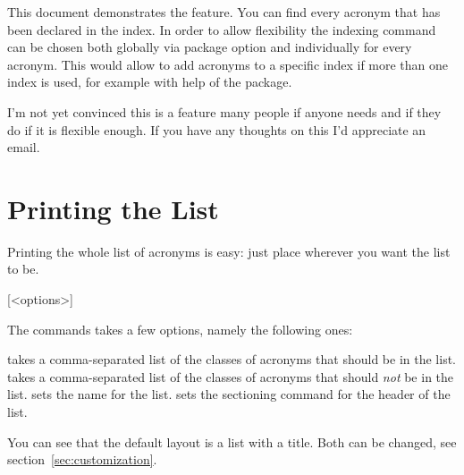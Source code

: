 \documentclass[DIV10,toc=index,toc=bib,hyperfootnotes=false]{cnpkgdoc}
\makeatletter
\newcommand*\changedversion[1]{%
  \@bsphack
  \marginnote{%
    \footnotesize\sffamily\RaggedRight
    \textcolor{black!75}{Changed in version~#1}}%
  \@esphack}
\makeatother
\begin{document}
This document demonstrates the feature. You can find every acronym that has been
declared in the index. In order to allow flexibility the indexing command can be
chosen both globally via package option and individually for every acronym. This
would allow to add acronyms to a specific index if more than one index is used,
for example with help of the  package.

I'm not yet convinced this is a feature many people if anyone needs and if they
do if it is flexible enough. If you have any thoughts on this I'd appreciate an
email.

\section{Printing the List}\label{sec:print_lists}
\noindent\changedversion{1.0}Printing the whole list of acronyms is easy: just
place  wherever you want the list to be.
\begin{beschreibung}
 [<options>]
\end{beschreibung}
The commands takes a few options, namely the following ones:
\begin{beschreibung}
 \newline
   takes a comma-separated list of the classes of acronyms that should be in the
   list.
 \newline
   takes a comma-separated list of the classes of acronyms that should \emph{not}
   be in the list.
 \newline
   sets the name for the list.
   sets the sectioning command for the header of the list.
\end{beschreibung}
\begin{beispiel}
 \printacronyms[exclude-classes=city]

 \printacronyms[include-classes=city,name={City Acronyms}]
\end{beispiel}
\printacronyms[exclude-classes=city]

\printacronyms[include-classes=city,name={City Acronyms}]

You can see that the default layout is a  list with a
 title. Both can be changed, see section~\ref{sec:customization}.
\end{document}
